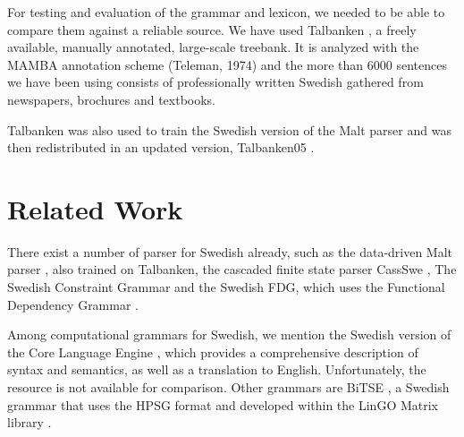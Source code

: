 \documentclass[runningheads,a4paper]{llncs}
\begin{document}
\label{sec:talbanken}
For testing and evaluation of the grammar and lexicon, we needed to be able to
compare them against a reliable source.
We have used Talbanken \cite{talbanken},
a freely available, manually annotated, large-scale treebank.
It is analyzed with the MAMBA annotation scheme (Teleman, 1974) and 
the more than 6000 sentences we have been using
consists of professionally written Swedish gathered from newspapers, brochures and textbooks.

Talbanken was also used to train the Swedish version of the Malt parser \cite{malt}
and was then redistributed in an updated version,
Talbanken05 \cite{talbanken05}.



 
\section{Related Work}
%
There exist a number of parser for Swedish already, such as the
data-driven Malt parser \cite{malt}, also trained on Talbanken, the 
cascaded finite state parser CassSwe \cite{casswe}, %
The Swedish Constraint Grammar \cite{birn} and the Swedish FDG, which
uses the Functional Dependency Grammar \cite{fdg}.

Among computational grammars for Swedish, we mention the Swedish
version of the Core Language Engine \cite{gamback}, which
provides a comprehensive description of syntax and semantics, as well
as a translation to English. Unfortunately, the resource is not
available for comparison. Other grammars are BiTSE \cite{stymne}, a
Swedish grammar that uses the HPSG format \cite{hpsg} and developed
within the LinGO Matrix library \cite{matrix}. 
\end{document}
